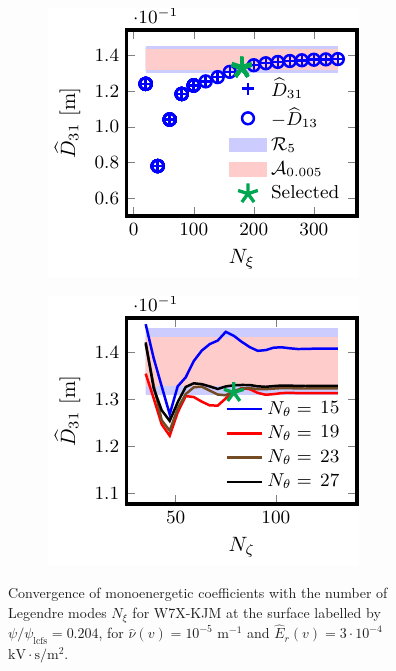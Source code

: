 \documentclass[10pt]{iopart}
\begin{document}
\begin{figure}[t]
	
	\begin{subfigure}[t]{0.32\textwidth}
		\includegraphics{Convergence-Legendre-W7X-KJM-s0204-Er-3e-4-D31-Detail}
%		
		\caption{}
		\label{subfig:D31_convergence_Legendre_W7X_KJM_0204_Erho_3e-4_Detail}
	\end{subfigure}
	\begin{subfigure}[t]{0.32\textwidth}
		\includegraphics{Convergence-theta-zeta-W7X-KJM-s0204-Er-3e-4-D31}
%		
		\caption{}
		\label{subfig:D31_convergence_theta_zeta_W7X_KJM_0204_Erho_3e-4_Detail}
	\end{subfigure}
	
	
	\caption{Convergence of monoenergetic coefficients with the number of Legendre modes $N_\xi$ for W7X-KJM at the surface labelled by $\psi/\psi_{\text{lcfs}}=0.204$, for $\hat{\nu}(v)=10^{-5}$ $\text{m}^{-1}$ and $\widehat{E}_r(v)=3\cdot 10^{-4}$ $\text{kV}\cdot\text{s}/\text{m}^2$.}
	\label{fig:Convergence_W7X_KJM_Er_3e-4}
\end{figure}
\end{document}
